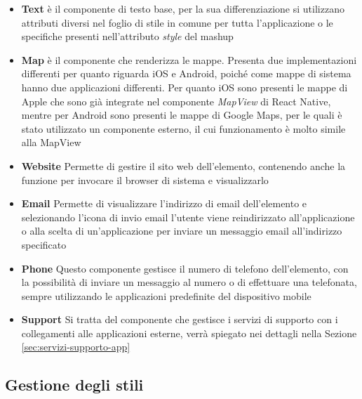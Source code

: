 	\begin{itemize}
		\item \textbf{Text} è il componente di testo base, per la sua differenziazione si utilizzano attributi diversi nel foglio di stile in comune per tutta l'applicazione o le specifiche presenti nell'attributo \emph{style} del mashup
		\item \textbf{Map} è il componente che renderizza le mappe. Presenta due implementazioni differenti per quanto riguarda iOS e Android, poiché come mappe di sistema hanno due applicazioni differenti. Per quanto iOS sono presenti le mappe di Apple che sono già integrate nel componente \emph{MapView} di React Native, mentre per Android sono presenti le mappe di Google Maps, per le quali è stato utilizzato un componente esterno, il cui funzionamento è molto simile alla MapView
		\item \textbf{Website} Permette di gestire il sito web dell'elemento, contenendo anche la funzione per invocare il browser di sistema e visualizzarlo
		\item \textbf{Email} Permette di visualizzare l'indirizzo di email dell'elemento e selezionando l'icona di invio email l'utente viene reindirizzato all'applicazione o alla scelta di un'applicazione per inviare un messaggio email all'indirizzo specificato
		\item \textbf{Phone} Questo componente gestisce il numero di telefono dell'elemento, con la possibilità di inviare un messaggio al numero o di effettuare una telefonata, sempre utilizzando le applicazioni predefinite del dispositivo mobile
		\item \textbf{Support} Si tratta del componente che gestisce i servizi di supporto con i collegamenti alle applicazioni esterne, verrà spiegato nei dettagli nella Sezione \ref{sec:servizi-supporto-app}
	\end{itemize}

\subsection{Gestione degli stili}

